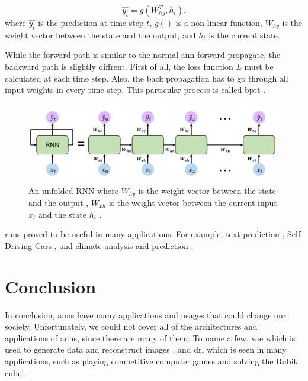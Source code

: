 \documentclass[runningheads]{llncs}
\begin{document}
\begin{equation}
    \label{rnny}
    \hat{y_{t}} = g(W^T_{hy}, h_{t}).
\end{equation}
where $\hat{y_{t}}$ is the prediction at time step $t$, $g()$ is a non-linear function,
$W_{hy}$ is the weight vector between the state and the output, and $h_{t}$ is the current state.


While the forward path is similar to the normal \gls{ann} forward propagate, 
the backward path is slightly diffrent. First of all, the loss function $L$ must be calculated
at each time step. Also, the back propagation has to go through all input weights in 
every time step. This particular process is called \gls{bptt} \cite{werbos1990backpropagation}.

\begin{figure}[H]
    \label{rnnf}
    \centering
    \includegraphics[height=3.5cm]{rnn}
    \caption{An unfolded RNN where $W_{hy}$ is the weight vector between the state and the output 
    , $W_{xh}$ is the weight vector between the current input $x_{t}$ and the state $h_{t}$ \cite{mitlectwo}.}
\end{figure}

\gls{rnns} proved to be useful in many applications. For example, 
text prediction \cite{jagannatha2016structured}, Self-Driving Cars \cite{gu2020lstm}, and climate analysis and prediction \cite{earthnet}.


\section{Conclusion}

In conclusion, \gls{anns} have many applications and usages that 
could change our society.
Unfortunately, we could not cover all of the architectures and applications of \gls{anns},
since there are many of them. To name a few, \gls{vae} which is used to generate data and 
reconstruct images \cite{hou2017deep} \cite{yan2016attribute2image}, and 
\gls{drl} which is seen in many applications, such as playing competitive computer games \cite{berner2019dota} and solving the Rubik cube \cite{openairubikcube}.
\end{document}
